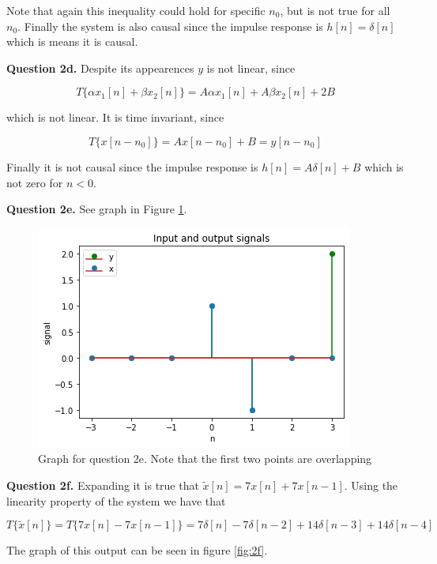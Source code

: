 \documentclass[letterpaper, reqno,11pt]{article}
\begin{document}
Note that again this inequality could hold for specific $n_0$, but is not true for all $n_0$. Finally the system is also causal since the impulse response is $h[n]=\delta[n]$ which is means it is causal. 

{\noindent\bf Question 2d.} Despite its appearences $y$ is not linear, since 

$$
    T\{\alpha x_1[n] + \beta x_2[n]\}=A\alpha x_1[n] + A\beta x_2[n]+2B
$$

which is not linear. It is time invariant, since 

$$
    T\{x[n-n_0]\}=Ax[n-n_0]+B=y[n-n_0]
$$

Finally it is not causal since the impulse response is $h[n]=A\delta[n]+B$ which is not zero for $n<0$. 

{\noindent\bf Question 2e.} See graph in Figure \ref{fig:2e}. 


\begin{figure}[htbp]
\centering
\includegraphics[width=\textwidth]{2e}
\caption{Graph for question 2e. Note that the first two points are overlapping}
\label{fig:2e}
\end{figure}

{\noindent\bf Question 2f.} Expanding it is true that $\tilde x[n] = 7x[n]+7x[n-1]$. Using the linearity property of the system we have that 

$$
    T\{\tilde x[n]\}=T\{7x[n]-7x[n-1]\}=7\delta[n]-7\delta[n-2]+14\delta[n-3]+14\delta[n-4]
$$

The graph of this output can be seen in figure \ref{fig:2f}. 
\end{document}
